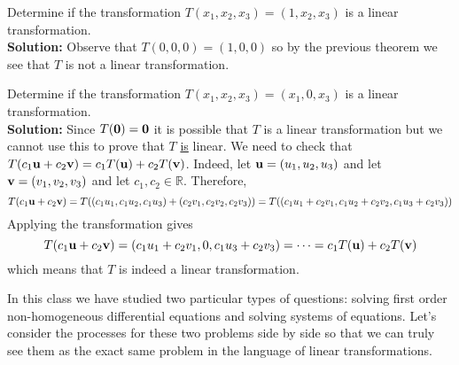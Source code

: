 \begin{example}
   Determine if the transformation $T(x_1,x_2,x_3) = (1,x_2,x_3)$ is a linear
   transformation. \\
   {\bf Solution:} Observe that $T(0,0,0) = (1,0,0)$ so by the previous theorem we see that
   $T$ is not a linear transformation.
\end{example}

\begin{example}
    Determine if the transformation $T(x_1,x_2,x_3) = (x_1,0,x_3)$ is a linear
    transformation. \\
    {\bf Solution:} Since $T({\bf 0}) ={\bf 0}$ it is possible that $T$ is a linear transformation
    but we cannot use this to prove that $T$ \underline{is} linear.  We need to check that
    $T(c_1 {\bf u} + c_2 {\bf v}) = c_1 T({\bf u}) + c_2 T({\bf v})$.  Indeed, let ${\bf u} = (u_1,u_2,u_3)$
    and let ${\bf v} = (v_1,v_2,v_3)$ and let $c_1, c_2 \in \mathbb{R}$.  Therefore,
    \[ T(c_1 {\bf u} + c_2 {\bf v}) = T( (c_1 u_1, c_1 u_2, c_1 u_3) + (c_2 v_1, c_2 v_2, c_2
    v_3)) = T( (c_1 u_1 + c_2 v_1, c_1 u_2 + c_2 v_2, c_1 u_3 + c_2 v_3)) \]
    Applying the transformation gives
    \[ T(c_1 {\bf u} + c_2 {\bf v}) = (c_1 u_1 + c_2 v_1, 0, c_1 u_3 + c_2 v_3) =\cdots =  c_1 T({\bf u}) + c_2
    T({\bf v}) \]
    which means that $T$ is indeed a linear transformation.
\end{example}

In this class we have studied two particular types of questions: solving first order
non-homogeneous differential equations and solving systems of equations.  Let's consider
the processes for these two problems side by side so that we can truly see them as the
exact same problem in the language of linear transformations.

